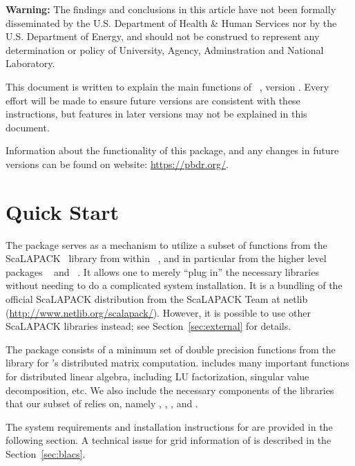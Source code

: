 {\color{red} \bf Warning:}
The findings and conclusions in this article have not been
formally disseminated by the U.S. Department of Health \& Human Services
nor by the U.S. Department of Energy,
and should not be construed to represent any determination or
policy of University, Agency, Adminstration and National Laboratory.

This document is written to explain the main
functions of ~\citep{Chen2012pbdSLAPpackage}, version \slapversion.
Every effort will be made to ensure future versions are consistent with
these instructions, but features in later versions may not be explained
in this document.

Information about the functionality of this package,
and any changes in future versions can be found on website:
\url{https://pbdr.org/}.



\section[Quick Start]{Quick Start}
\label{sec:quick_start}

The  package serves as a mechanism to utilize a subset of
functions from the ScaLAPACK~\citep{ScaLAPACK1997} library from within
~\citep{Rcore}, and in particular from the higher level
 packages ~\citep{Schmidt2012pbdBASEpackage} and
~\citep{Schmidt2012pbdDMATpackage}. It allows one to merely
``plug in'' the necessary libraries without needing to do a complicated
system installation.  It is a bundling of the official ScaLAPACK distribution
from the ScaLAPACK Team at netlib (\url{http://www.netlib.org/scalapack/}).
However, it is possible to use other ScaLAPACK libraries instead; see
Section~\ref{sec:external} for details.

The  package consists of a minimum set of double precision
functions from the  library
for 's distributed matrix computation. 
includes many important functions for distributed linear algebra, including
LU factorization, singular value decomposition, etc.
We also include the necessary components of the libraries that our subset of
 relies on, namely ,
, , and .  

The system requirements and installation instructions for  are
provided in the following section.
A technical issue for grid information of  is described in
the Section~\ref{sec:blacs}.


